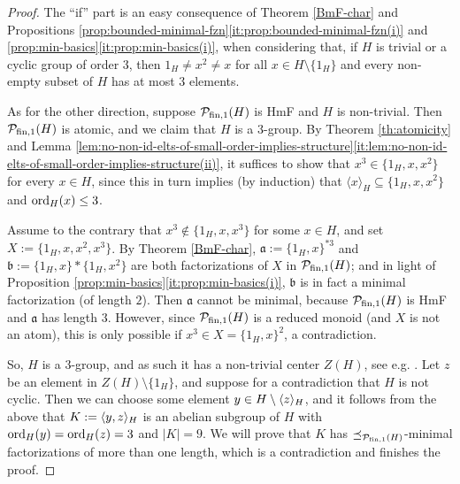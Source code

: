 \begin{proof}
	The ``if'' part is an easy consequence of Theorem \ref{BmF-char} and Propositions \ref{prop:bounded-minimal-fzn}\ref{it:prop:bounded-minimal-fzn(i)} and \ref{prop:min-basics}\ref{it:prop:min-basics(i)}, when considering that, if $H$ is trivial or a cyclic group of order $3$, then $1_H \ne x^2 \ne x$ for all $x \in H \setminus \{1_H\}$ and every non-empty subset of $H$ has at most $3$ elements.
		
		
	As for the other direction, suppose $\mathcal P_{\textrm{fin}, 1}(H)$ is HmF and $H$ is non-trivial. Then $\mathcal P_{\textrm{fin}, 1}(H)$ is atomic, and we claim that $H$ is a $3$-group. By Theorem \ref{th:atomicity} and Lemma \ref{lem:no-non-id-elts-of-small-order-implies-structure}\ref{it:lem:no-non-id-elts-of-small-order-implies-structure(ii)}, it suffices to show that
	$
	x^3 \in \{1_H, x, x^2\}$ for every $x \in H$, since this in turn implies (by induction) that $\langle x \rangle_H \subseteq \{1_H, x, x^2\}$ and ${\operatorname{ord}}_H(x) \le 3$.
	
	{Assume to the contrary} that $x^3 \notin \{1_H, x, x^3\}$ for some $x \in H$, and set $X := \{1_H, x, x^2, x^3\}$. By Theorem \ref{BmF-char}, $\mathfrak a := \{1_H, x\}^{\ast 3}$ and $\mathfrak b := \{1_H, x\} \ast \{1_H, x^2\}$ are both factorizations of $X$ in $\mathcal P_{\textrm{fin}, 1}(H)$; and in light of Proposition \ref{prop:min-basics}\ref{it:prop:min-basics(i)}, $\mathfrak b$ is in fact a minimal factorization (of length $2$). Then $\mathfrak a$ cannot be minimal, because $\mathcal P_{\textrm{fin}, 1}(H)$ is HmF and $\mathfrak a$ has length $3$. However, since $\mathcal P_{\textrm{fin}, 1}(H)$ is a reduced monoid (and $X$ is not an atom), this is only possible if $x^3 \in X = \{1_H, x\}^2$, a contradiction.
	
	So, $H$ is a $3$-group, and as such it has a non-trivial center $Z(H)$, see e.g. \cite[Theorem 2.11(i)]{gorenstein80}. Let $z$ be an element in $Z(H) \setminus \{1_H\}$, and suppose for a contradiction that $H$ is not cyclic. Then we can choose some element $y \in H \setminus \langle z \rangle_H$, and it follows from the above that $K := \langle y,z \rangle_H$ is an abelian subgroup of $H$ with ${\operatorname{ord}}_H(y) = {\operatorname{ord}}_H(z) = 3$ and $|K| = 9$. 
	We will prove that $K$ has $\preceq_{\mathcal P_{\textrm{fin}, 1}(H)}$-minimal factorizations of more than one length, which is a contradiction and finishes the proof.
	

\end{proof}
